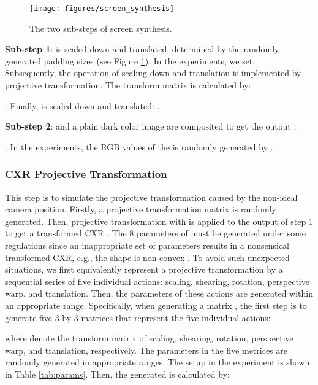 \documentclass[preprint, 12pt]{elsarticle}
\begin{document}
\begin{figure}
    \centering
    \texttt{[image: figures/screen\_synthesis]}
    \caption{The two sub-steps of screen synthesis.}
    \label{fig:screen_synthesis}
\end{figure}


\textbf{Sub-step 1}:  is scaled-down and translated, determined by the randomly generated padding sizes  (see Figure \ref{fig:screen_synthesis}). In the experiments, we set:  . Subsequently, the operation of scaling down and translation is implemented by projective transformation. The transform matrix  is calculated by:

. Finally,  is scaled-down and translated: .

\textbf{Sub-step 2}:  and a plain dark color image  are composited to get the output :

. In the experiments, the RGB values of the  is randomly generated by .

\subsubsection{CXR Projective Transformation}

This step is to simulate the projective transformation caused by the non-ideal camera position. Firstly, a projective transformation matrix  is randomly generated. Then, projective transformation with  is applied to the output of step 1 to get a transformed CXR .
The 8 parameters  of  must be generated under some regulations since an inappropriate set of parameters results in a nonsensical transformed CXR, e.g., the shape is non-convex \cite{hartley1999theory,solomon2011fundamentals}. To avoid such unexpected situations, we first equivalently represent a projective transformation by a sequential series of five individual actions: scaling, shearing, rotation, perspective warp, and translation. Then, the parameters of these actions are generated within an appropriate range. Specifically, when generating a matrix , the first step is to generate five 3-by-3 matrices that represent the five individual actions: 


where  denote the transform matrix of scaling, shearing, rotation, perspective warp, and translation, respectively. The parameters in the five metrices are randomly generated in appropriate ranges. The setup in the experiment is shown in Table \ref{tab:params}.
Then, the generated  is calculated by:
\end{document}
